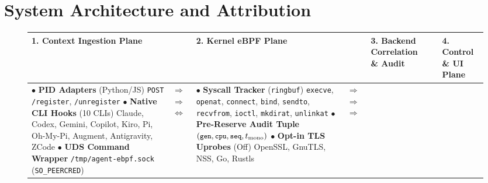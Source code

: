 \documentclass[10pt,twocolumn,letterpaper]{article}
\newcommand{\code}[1]{\texttt{\small #1}}
\begin{document}
\section{System Architecture and Attribution}
\label{sec:design}

\begin{figure}[t]
\centering
\footnotesize
\setlength{\tabcolsep}{4pt}
\begin{tabular}{@{}p{}p{}p{}p{}p{}p{}p{}@{}}
\toprule
\textbf{1. Context Ingestion Plane} & & \textbf{2. Kernel eBPF Plane} & & \textbf{3. Backend Correlation \& Audit} & & \textbf{4. Control \& UI Plane} \\
\midrule
$\bullet$ \textbf{PID Adapters} (Python/JS) \newline \code{POST /register}, \code{/unregister} \vspace{3pt} \newline
$\bullet$ \textbf{Native CLI Hooks} (10 CLIs) \newline Claude, Codex, Gemini, Copilot, Kiro, Pi, Oh-My-Pi, Augment, Antigravity, ZCode \vspace{3pt} \newline
$\bullet$ \textbf{UDS Command Wrapper} \newline \code{/tmp/agent-ebpf.sock} (\code{SO\_PEERCRED})
& $\Longrightarrow$ \newline \vspace{15pt} $\Longrightarrow$ \newline \vspace{15pt} $\Longleftrightarrow$
& $\bullet$ \textbf{Syscall Tracker} (\code{ringbuf}) \newline \code{execve}, \code{openat}, \code{connect}, \code{bind}, \code{sendto}, \code{recvfrom}, \code{ioctl}, \code{mkdirat}, \code{unlinkat} \vspace{3pt} \newline
$\bullet$ \textbf{Pre-Reserve Audit Tuple} \newline $(\code{gen}, \code{cpu}, \code{seq}, t_{\text{mono}})$ \vspace{3pt} \newline
$\bullet$ \textbf{Opt-in TLS Uprobes} (Off) \newline OpenSSL, GnuTLS, NSS, Go, Rustls
& $\Longrightarrow$ \newline \vspace{15pt} $\Longrightarrow$ \newline \vspace{15pt} $\Longrightarrow$

\end{tabular}
\end{figure}
\end{document}
